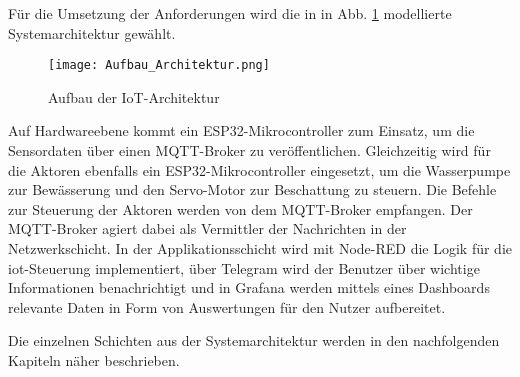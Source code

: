 Für die Umsetzung der Anforderungen wird die in in Abb. \ref{fig:iotschichten} modellierte Systemarchitektur gewählt.

\begin{figure}[h]
  \centering
  \texttt{[image: Aufbau\_Architektur.png]}
  \caption{Aufbau der IoT-Architektur}\label{fig:iotschichten}
\end{figure}

Auf Hardwareebene kommt ein ESP32-Mikrocontroller zum Einsatz, um die Sensordaten über einen MQTT-Broker zu veröffentlichen. Gleichzeitig wird für die Aktoren ebenfalls ein ESP32-Mikrocontroller eingesetzt, um die Wasserpumpe zur Bewässerung und den Servo-Motor zur Beschattung zu steuern. Die Befehle zur Steuerung der Aktoren werden von dem MQTT-Broker empfangen. Der MQTT-Broker agiert dabei als Vermittler der Nachrichten in der Netzwerkschicht. In der Applikationsschicht wird mit Node-RED die Logik für die \gls{iot}-Steuerung implementiert, über Telegram wird der Benutzer über wichtige Informationen benachrichtigt und in Grafana werden mittels eines Dashboards relevante Daten in Form von Auswertungen für den Nutzer aufbereitet.

Die einzelnen Schichten aus der Systemarchitektur werden in den nachfolgenden Kapiteln näher beschrieben.